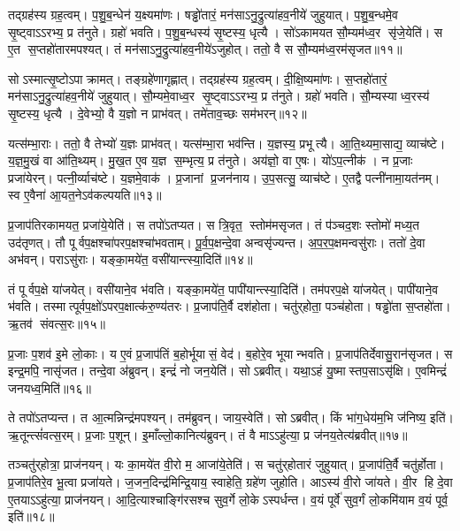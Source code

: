 तद्ग्रह॑स्य ग्रह॒त्वम्।
प॒शु॒ब॒न्धेन॑ य॒क्ष्यमा॑णः।
षड्ढो॑तारं॒ मन॑साऽनु॒द्रुत्या॑हव॒नीये॑ जुहुयात्।
प॒शु॒ब॒न्धमे॒व सृ॒ष्ट्वाऽऽरभ्य॒ प्र त॑नुते।
ग्रहो॑ भवति।
प॒शु॒ब॒न्धस्य॑ सृ॒ष्टस्य॒ धृत्यै।
सो॑ऽकामयत सौ॒म्यम॑ध्व॒र सृ॑जे॒येति॑।
स ए॒त स॒प्तहो॑तारमपश्यत्।
तं मन॑साऽनु॒द्रुत्या॑हव॒नीये॑ऽजुहोत्।
ततो॒ वै स सौ॒म्यम॑ध्व॒रम॑सृजत॥११॥

सोऽस्मात्सृ॒ष्टोऽपाक्रामत्।
तङ्ग्रहे॑णागृह्णात्।
तद्ग्रह॑स्य ग्रह॒त्वम्।
दी॒क्षि॒ष्यमा॑णः।
स॒प्तहो॑तारं॒ मन॑साऽनु॒द्रुत्या॑हव॒नीये॑ जुहुयात्।
सौ॒म्यमे॒वाध्व॒र सृ॒ष्ट्वाऽऽरभ्य॒ प्र त॑नुते।
ग्रहो॑ भवति।
सौ॒म्यस्याध्व॒रस्य॑ सृ॒ष्टस्य॒ धृत्यै।
दे॒वेभ्यो॒ वै य॒ज्ञो न प्राभ॑वत्।
तमे॑ताव॒च्छः सम॑भरन्॥१२॥

यत्स॑म्भा॒राः।
ततो॒ वै तेभ्यो॑ य॒ज्ञः प्राभ॑वत्।
यत्स॑म्भा॒रा भव॑न्ति।
य॒ज्ञस्य॒ प्रभूत्यै।
आ॒ति॒थ्यमा॒साद्य॒ व्याच॑ष्टे।
य॒ज्ञ॒मु॒खं वा आ॑ति॒थ्यम्।
मु॒ख॒त ए॒व य॒ज्ञ स॒म्भृत्य॒ प्र त॑नुते।
अय॑ज्ञो॒ वा ए॒षः।
यो॑ऽप॒त्नीक॑।
न प्र॒जाः प्रजा॑येरन्।
पत्नी॒र्व्याच॑ष्टे।
य॒ज्ञमे॒वाक॑।
प्र॒जानां प्र॒जन॑नाय।
उ॒प॒सत्सु॒ व्याच॑ष्टे।
ए॒तद्वै पत्नी॑नामा॒यत॑नम्।
स्व ए॒वैना॑ आ॒यत॒नेऽव॑कल्पयति॥१३॥\anuvakamend[त॒नु॒त॒ आ॒लभ॑मानोऽगृह्णादसृजताभरञ्जायेर॒न्थ्षट्च॑]

प्र॒जाप॑तिरकामयत॒ प्रजा॑ये॒येति॑।
स तपो॑ऽतप्यत।
स त्रि॒वृत॒ स्तोम॑मसृजत।
तं प॑ञ्चद॒शः स्तोमो॑ मध्य॒त उद॑तृणत्।
तौ पूर्वप॒क्षश्चा॑परप॒क्षश्चा॑भवताम्।
पू॒र्व॒प॒क्षन्दे॒वा अन्वसृ॑ज्यन्त।
अ॒प॒र॒प॒क्षमन्वसु॑राः।
ततो॑ दे॒वा अभ॑वन्।
पराऽसु॑राः।
यङ्का॒मये॑त॒ वसी॑यान्त्स्या॒दिति॑॥१४॥

तं पूर्वप॒क्षे या॑जयेत्।
वसी॑याने॒व भ॑वति।
यङ्का॒मये॑त॒ पापी॑यान्त्स्या॒दिति॑।
तम॑परप॒क्षे या॑जयेत्।
पापी॑याने॒व भ॑वति।
तस्मात्पूर्वप॒क्षो॑ऽपरप॒क्षात्क॑रु॒ण्य॑तरः।
प्र॒जाप॑ति॒र्वै दश॑होता।
चतु॑र्‌होता॒ पञ्च॑होता।
षड्ढो॑ता स॒प्तहो॑ता।
ऋ॒तव॑ संवत्स॒रः॥१५॥

प्र॒जाः प॒शव॑ इ॒मे लो॒काः।
य ए॒वं प्र॒जाप॑तिं ब॒होर्भूयासं॒ वेद॑।
ब॒होरे॒व भूयान्भवति।
प्र॒जाप॑तिर्देवासु॒रान॑सृजत।
स इन्द्र॒मपि॒ नासृ॑जत।
तन्दे॒वा अ॑ब्रुवन्।
इन्द्रं॑ नो जन॒येति॑।
सोऽब्रवीत्।
यथा॒ऽहं यु॒ष्मास्तप॒साऽसृ॑क्षि।
ए॒वमिन्द्रं॑ जनयध्व॒मिति॑॥१६॥

ते तपो॑ऽतप्यन्त।
त आ॒त्मन्निन्द्र॑मपश्यन्।
तम॑ब्रुवन्।
जाय॒स्वेति॑।
सोऽब्रवीत्।
किं भा॑ग॒धेय॑म॒भि ज॑निष्य॒ इति॑।
ऋ॒तून्त्सं॑वत्स॒रम्।
प्र॒जाः प॒शून्।
इ॒माँल्लो॒कानित्य॑ब्रुवन्।
तं वै माऽऽहु॑त्या॒ प्र ज॑नय॒तेत्य॑ब्रवीत्॥१७॥

तञ्चतु॑र्‌होत्रा॒ प्राज॑नयन्।
यः का॒मये॑त वी॒रो म॒ आजा॑ये॒तेति॑।
स चतु॑र्‌होतारं जुहुयात्।
प्र॒जाप॑ति॒र्वै चतु॑र्होता।
प्र॒जाप॑तिरे॒व भू॒त्वा प्रजा॑यते।
ज॒जन॒दिन्द्र॑मिन्द्रि॒याय॒ स्वाहेति॒ ग्रहे॑ण जुहोति।
आऽस्य॑ वी॒रो जा॑यते।
वी॒र हि दे॒वा ए॒तयाऽऽहु॑त्या॒ प्राज॑नयन्।
आ॒दि॒त्याश्चाङ्गि॑रसश्च सुव॒र्गे लो॒केऽस्पर्धन्त।
व॒यं पूर्वे॑ सुव॒र्गं लो॒कमि॑याम व॒यं पूर्व॒ इति॑॥१८॥

